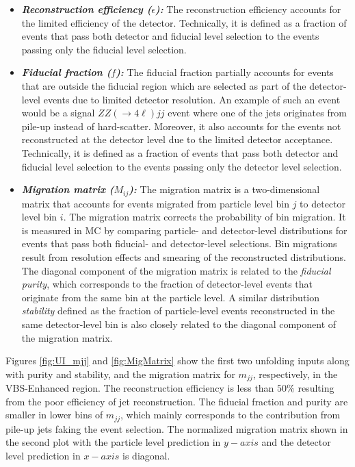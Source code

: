 \begin{itemize}
    \item{\textit{\textbf{Reconstruction efficiency ($\epsilon$):}} The reconstruction efficiency accounts for the limited efficiency of the detector. Technically, it is defined as a fraction of events that pass both detector and fiducial level selection to the events passing only the fiducial level selection. }
    
    \item{\textit{\textbf{Fiducial fraction ($f$):}} The fiducial fraction partially accounts for events that are outside the fiducial region which are selected as part of the detector-level events due to limited detector resolution. An example of such an event would be a signal $ZZ ( \rightarrow 4\ell) jj$ event where one of the jets originates from pile-up instead of hard-scatter. Moreover, it also accounts for the events not reconstructed at the detector level due to the limited detector acceptance. Technically, it is defined as a fraction of events that pass both detector and fiducial level selection to the events passing only the detector level selection. }
    
    \item{\textit{\textbf{Migration matrix ($M_{ij}$):}} The migration matrix is a two-dimensional matrix that accounts for events migrated from particle level bin $j$ to detector level bin $i$. The migration matrix corrects the probability of bin migration. It is measured in MC by comparing particle- and detector-level distributions for events that pass both fiducial- and detector-level selections. Bin migrations result from resolution effects and smearing of the reconstructed distributions. The diagonal component of the migration matrix is related to the \textit{fiducial purity}, which corresponds to the fraction of detector-level events that originate from the same bin at the particle level. A similar distribution \textit{stability} defined as the fraction of particle-level events reconstructed in the same detector-level bin is also closely related to the diagonal component of the migration matrix. }
\end{itemize}

Figures \ref{fig:UI_mjj} and \ref{fig:MigMatrix} show the first two unfolding inputs along with purity and stability, and the migration matrix for $m_{jj}$, respectively, in the VBS-Enhanced region. The reconstruction efficiency is less than $50\%$ resulting from the poor efficiency of jet reconstruction. The fiducial fraction and purity are smaller in lower bins of $m_{jj}$, which mainly corresponds to the contribution from pile-up jets faking the event selection. The normalized migration matrix shown in the second plot with the particle level prediction in $y-axis$ and the detector level prediction in $x-axis$ is diagonal.

